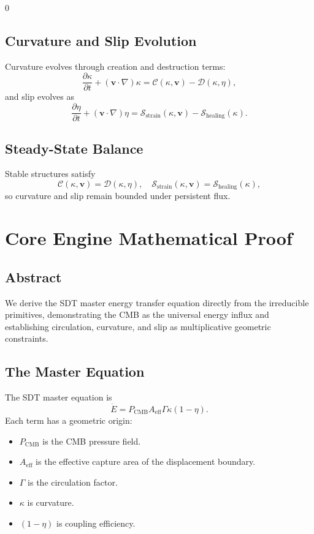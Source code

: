 0\documentclass[12pt]{book}
\begin{document}
\section{Curvature and Slip Evolution}
Curvature evolves through creation and destruction terms:
\begin{equation}
\frac{\partial \kappa}{\partial t} + (\mathbf{v}\cdot\nabla)\kappa
  = \mathcal{C}(\kappa,\mathbf{v}) - \mathcal{D}(\kappa,\eta),
\end{equation}
and slip evolves as
\begin{equation}
\frac{\partial \eta}{\partial t} + (\mathbf{v}\cdot\nabla)\eta
  = \mathcal{S}_{\text{strain}}(\kappa,\mathbf{v}) - \mathcal{S}_{\text{healing}}(\kappa).
\end{equation}

\section{Steady-State Balance}
Stable structures satisfy
\begin{equation}
\mathcal{C}(\kappa,\mathbf{v}) = \mathcal{D}(\kappa,\eta), \quad
\mathcal{S}_{\text{strain}}(\kappa,\mathbf{v}) = \mathcal{S}_{\text{healing}}(\kappa),
\end{equation}
so curvature and slip remain bounded under persistent flux.

\chapter{Core Engine Mathematical Proof}

\section*{Abstract}
We derive the SDT master energy transfer equation directly from the irreducible primitives, demonstrating
the CMB as the universal energy influx and establishing circulation, curvature, and slip as multiplicative
geometric constraints.

\section{The Master Equation}
The SDT master equation is
\begin{equation}
\boxed{\dot{E} = P_{\text{CMB}} A_{\text{eff}} \Gamma \kappa (1-\eta)}.
\end{equation}
Each term has a geometric origin:
\begin{itemize}
\item $P_{\text{CMB}}$ is the CMB pressure field.
\item $A_{\text{eff}}$ is the effective capture area of the displacement boundary.
\item $\Gamma$ is the circulation factor.
\item $\kappa$ is curvature.
\item $(1-\eta)$ is coupling efficiency.
\end{itemize}
\end{document}
